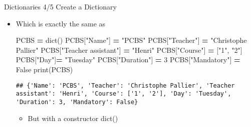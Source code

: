 \documentclass[
  8pt,
  ignorenonframetext,
]{beamer}
\newenvironment{Shaded}{\begin{snugshade}}{\end{snugshade}}
\newcommand{\BuiltInTok}[1]{#1}
\newcommand{\DecValTok}[1]{\textcolor[rgb]{0.00,0.00,0.81}{#1}}
\newcommand{\NormalTok}[1]{#1}
\newcommand{\OperatorTok}[1]{\textcolor[rgb]{0.81,0.36,0.00}{\textbf{#1}}}
\newcommand{\StringTok}[1]{\textcolor[rgb]{0.31,0.60,0.02}{#1}}
\newcommand{\VariableTok}[1]{\textcolor[rgb]{0.00,0.00,0.00}{#1}}
\providecommand{\tightlist}{%
  \setlength{\itemsep}{0pt}\setlength{\parskip}{0pt}}
\begin{document}
\begin{frame}[fragile]{Dictionaries 4/5 Create a Dictionary}
\protect\hypertarget{dictionaries-45-create-a-dictionary}{}
\begin{itemize}[<+->]
\item
  Which is exactly the same as

\begin{Shaded}
\begin{Highlighting}[]
\NormalTok{PCBS }\OperatorTok{=} \BuiltInTok{dict}\NormalTok{()}
\NormalTok{PCBS[}\StringTok{"Name"}\NormalTok{] }\OperatorTok{=} \StringTok{"PCBS"}
\NormalTok{PCBS[}\StringTok{"Teacher"}\NormalTok{] }\OperatorTok{=} \StringTok{"Christophe Pallier"}
\NormalTok{PCBS[}\StringTok{"Teacher assistant"}\NormalTok{] }\OperatorTok{=} \StringTok{"Henri"}
\NormalTok{PCBS[}\StringTok{"Course"}\NormalTok{] }\OperatorTok{=}\NormalTok{ [}\StringTok{"1"}\NormalTok{, }\StringTok{"2"}\NormalTok{]}
\NormalTok{PCBS[}\StringTok{"Day"}\NormalTok{]}\OperatorTok{=} \StringTok{"Tuesday"}
\NormalTok{PCBS[}\StringTok{"Duration"}\NormalTok{] }\OperatorTok{=} \DecValTok{3}
\NormalTok{PCBS[}\StringTok{"Mandatory"}\NormalTok{] }\OperatorTok{=} \VariableTok{False} 
\BuiltInTok{print}\NormalTok{(PCBS)}
\end{Highlighting}
\end{Shaded}

\begin{verbatim}
## {'Name': 'PCBS', 'Teacher': 'Christophe Pallier', 'Teacher assistant': 'Henri', 'Course': ['1', '2'], 'Day': 'Tuesday', 'Duration': 3, 'Mandatory': False}
\end{verbatim}

  \begin{itemize}[<+->]
  \tightlist
  \item
    But with a constructor dict()
  \end{itemize}
\end{itemize}
\end{frame}
\end{document}
